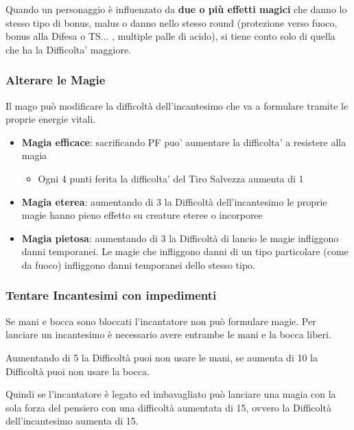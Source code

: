 \begin{multicols}{2}
Quando un personaggio è influenzato da \textbf{due o più effetti magici} che danno lo stesso tipo di bonus, malus o danno nello stesso round (protezione verso fuoco, bonus alla Difesa o TS... , multiple palle di acido), si tiene conto solo di quella che ha la Difficolta' maggiore.

\subsubsection{Alterare le Magie}

Il mago può modificare la difficoltà dell'incantesimo che va a formulare tramite le proprie energie vitali.

\begin{itemize}
	\item
	\textbf{Magia efficace}: sacrificando PF puo’ aumentare la difficolta’ a resistere alla magia
		\begin{itemize}
		\item Ogni 4 punti ferita la difficolta’ del Tiro Salvezza aumenta di 1
		\end{itemize}
	\item
	\textbf{Magia eterea}: aumentando di 3 la Difficoltà dell'incantesimo le proprie magie hanno pieno effetto su creature eteree o incorporee
	\item
	\textbf{Magia pietosa}: aumentando di 3 la Difficoltà di lancio le magie infliggono danni temporanei. 
	Le magie che infliggono danni di un tipo particolare (come da fuoco) infliggono danni temporanei dello stesso tipo.
\end{itemize}

\subsubsection{Tentare Incantesimi con impedimenti} 

Se mani e bocca sono bloccati l'incantatore non può formulare magie. Per lanciare un incantesimo è necessario avere entrambe le mani e la bocca liberi.

Aumentando di 5 la Difficoltà puoi non usare le mani, se aumenta di 10 la Difficoltà puoi non usare la bocca.

Quindi se l'incantatore è legato ed imbavagliato può lanciare una magia con la sola forza del pensiero con una difficoltà aumentata di 15, ovvero la Difficoltà dell'incantesimo aumenta di 15.


\end{multicols}
